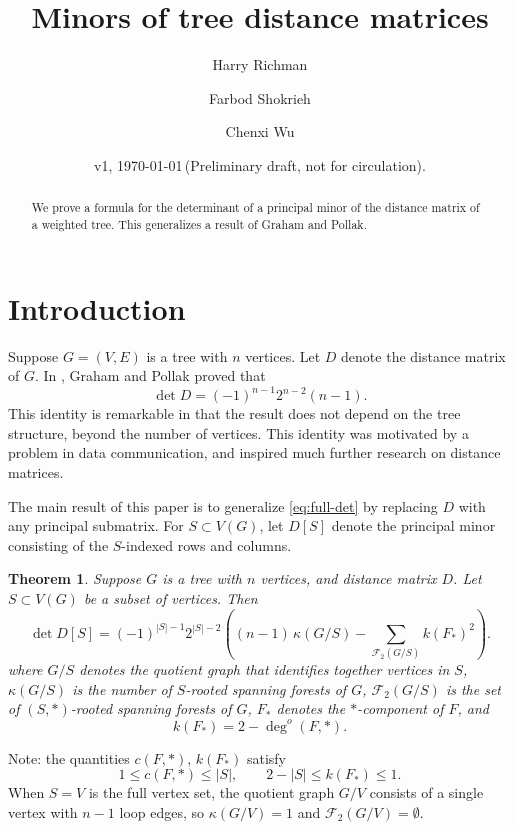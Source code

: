 \documentclass{amsart}
\newtheorem{thm}{Theorem}
\theoremstyle{definition}
\newcommand{\forests}{\mathcal{F}}
\begin{document}
\title[Tree distance minors]{Minors of tree distance matrices}
\author{Harry Richman}
\author{Farbod Shokrieh}
\author{Chenxi Wu}
\date{v1, \today  \,(Preliminary draft, not for circulation).}


\begin{abstract}
We prove a formula for the determinant of 
a principal minor of
the distance matrix of a weighted tree.
This generalizes a result of Graham and Pollak.
\end{abstract}
\maketitle

\setcounter{tocdepth}{1}
\tableofcontents

\section{Introduction}

Suppose $G = (V,E)$ is a tree with $n$ vertices.
Let $D$ denote the distance matrix of $G$.
In
\cite{graham-pollak},
Graham and Pollak proved that
\begin{equation}\label{eq:full-det}
\det D = (-1)^{n-1} 2^{n-2} (n-1). 
\end{equation}
This identity is remarkable in that the result does not depend on the tree structure,
beyond the number of vertices.
This identity was motivated by a problem in data communication,
and inspired much further research on distance matrices.


The main result of this paper is to generalize \eqref{eq:full-det} by replacing $D$ with any principal submatrix.
For $S \subset V(G)$, let $D[S]$ denote the principal minor consisting of the $S$-indexed rows and columns.
\begin{thm}
\label{thm:main}
Suppose $G$ is a tree with $n$ vertices, 
and distance matrix $D$.
Let $S \subset V(G)$ be a subset of vertices.
Then
\begin{equation}\label{eq:main}
\det D[S] = (-1)^{|S|-1} 2^{|S|-2} \left( (n-1)\, \kappa(G/S)  - \sum_{\mathcal F_2(G/S)} k(F_{*})^2  \right).
\end{equation}
where 
$G/S$ denotes the quotient graph that identifies together vertices in $S$,
$\kappa(G/S)$ is the number of $S$-rooted spanning forests of $G$,
$\forests_2(G/S)$ is the set of $(S,*)$-rooted spanning forests of $G$,
$F_{*}$ denotes the $*$-component of $F$, 
and
\begin{equation*}
k(F_{*}) 
= 2 - \deg^o(F,*).
\end{equation*}
\end{thm}
Note: the quantities $c(F,*)$, $k(F_*)$ satisfy
$$
1 \leq c(F,*) \leq |S|, \qquad
2 - |S| \leq k(F_*) \leq 1 .
$$
When $S = V$ is the full vertex set, the quotient graph $G / V$ consists of a single vertex with $n-1$ loop edges, 
so $\kappa(G/V) = 1$ and $\forests_2(G/V) = \emptyset$. 
\end{document}

